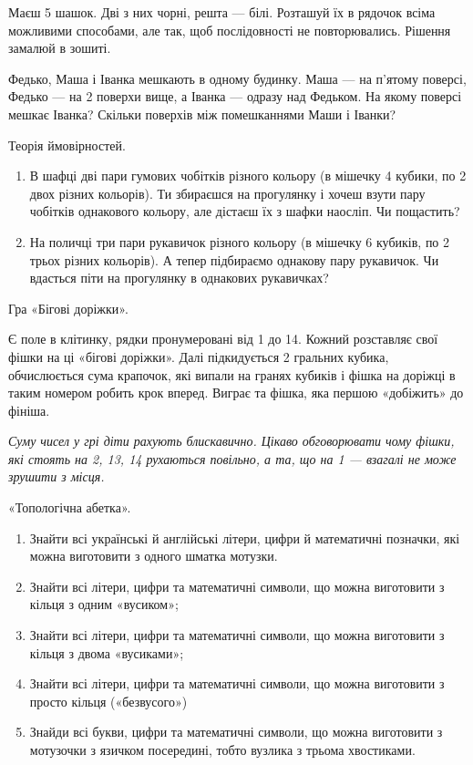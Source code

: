 \problem
Маєш 5 шашок. Дві з них чорні, решта --- білі.
Розташуй їх в рядочок всіма можливими способами, але так,
щоб послідовності не повторювались.
Рішення замалюй в зошиті.


\problem
Федько, Маша і Іванка мешкають в одному будинку.
Маша --- на п’ятому поверсі, Федько --- на 2 поверхи вище,
а Іванка --- одразу над Федьком.
На якому поверсі мешкає Іванка?
Скільки поверхів між помешканнями Маши і Іванки?


\problem
Теорія ймовірностей.
\begin{enumerate}
    \item В шафці дві пари гумових чобітків різного кольору
    (в мішечку 4 кубики, по 2 двох різних кольорів).
    Ти збираєшся на прогулянку і хочеш взути пару чобітків однакового кольору,
    але дістаєш їх з шафки наосліп. Чи пощастить?
    \item На поличці три пари рукавичок різного кольору
    (в мішечку 6 кубиків, по 2 трьох різних кольорів).
    А тепер підбираємо однакову пару рукавичок.
    Чи вдасться піти на прогулянку в однакових рукавичках?
\end{enumerate}


\problem
Гра «Бігові доріжки».

Є поле в клітинку, рядки пронумеровані від 1 до 14.
Кожний розставляє свої фішки на ці «бігові доріжки».
Далі підкидується 2 гральних кубика, обчислюється сума крапочок,
які випали на гранях кубиків і фішка на доріжці в таким номером
робить крок вперед.
Виграє та фішка, яка першою «добіжить» до фініша.

\emph{
Суму чисел у грі діти рахують блискавично.
Цікаво обговорювати чому фішки, які стоять на 2, 13, 14 рухаються повільно,
а та, що на 1 --- взагалі не може зрушити з місця.
}


\problem
«Топологічна абетка».
\begin{enumerate}
    \item Знайти всі українські й англійські літери, цифри
    й математичні позначки, які можна виготовити з одного шматка мотузки.
    \item Знайти всі літери, цифри та математичні символи,
    що можна виготовити з кільця з одним «вусиком»;
    \item Знайти всі літери, цифри та математичні символи,
    що можна виготовити з кільця з двома «вусиками»;
    \item Знайти всі літери, цифри та математичні символи,
    що можна виготовити з просто кільця («безвусого»)
    \item Знайди всі букви, цифри та математичні символи,
    що можна виготовити з мотузочки з язичком посередині,
    тобто вузлика з трьома хвостиками.
\end{enumerate}

